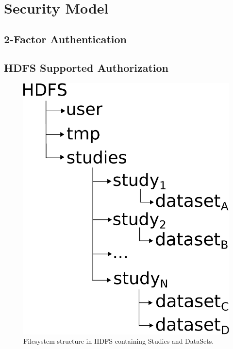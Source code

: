 \section{Security Model}

\subsection{2-Factor Authentication}



\subsection{HDFS Supported Authorization}

\begin{figure}[h]
 \centering
 \includegraphics[scale=0.2]{./imgs/HDFS-structure.eps}
 \caption{Filesystem structure in HDFS containing Studies and DataSets.}
\end{figure}
